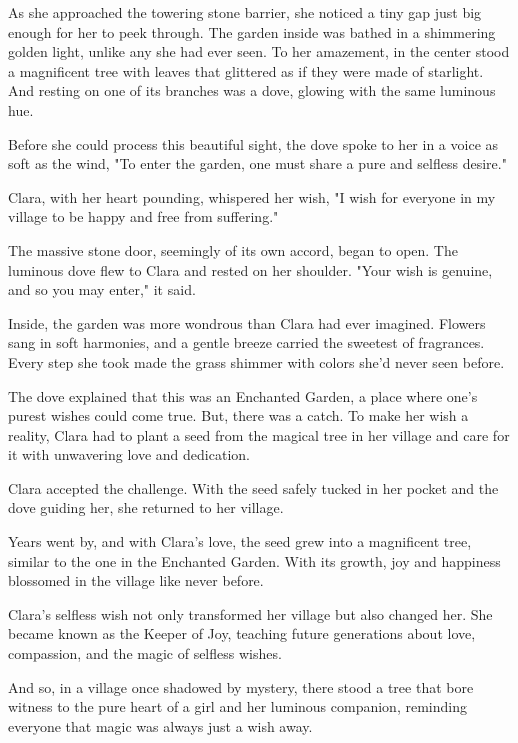 \documentclass[10pt, a4paper, titlepage]{article}
\begin{document}
As she approached the towering stone barrier, she noticed a tiny gap just big enough for her to peek through. The garden inside was bathed in a shimmering golden light, unlike any she had ever seen. To her amazement, in the center stood a magnificent tree with leaves that glittered as if they were made of starlight. And resting on one of its branches was a dove, glowing with the same luminous hue.

Before she could process this beautiful sight, the dove spoke to her in a voice as soft as the wind, "To enter the garden, one must share a pure and selfless desire."

Clara, with her heart pounding, whispered her wish, "I wish for everyone in my village to be happy and free from suffering."

The massive stone door, seemingly of its own accord, began to open. The luminous dove flew to Clara and rested on her shoulder. "Your wish is genuine, and so you may enter," it said.

Inside, the garden was more wondrous than Clara had ever imagined. Flowers sang in soft harmonies, and a gentle breeze carried the sweetest of fragrances. Every step she took made the grass shimmer with colors she'd never seen before.

The dove explained that this was an Enchanted Garden, a place where one’s purest wishes could come true. But, there was a catch. To make her wish a reality, Clara had to plant a seed from the magical tree in her village and care for it with unwavering love and dedication.

Clara accepted the challenge. With the seed safely tucked in her pocket and the dove guiding her, she returned to her village.

Years went by, and with Clara's love, the seed grew into a magnificent tree, similar to the one in the Enchanted Garden. With its growth, joy and happiness blossomed in the village like never before.

Clara's selfless wish not only transformed her village but also changed her. She became known as the Keeper of Joy, teaching future generations about love, compassion, and the magic of selfless wishes.

And so, in a village once shadowed by mystery, there stood a tree that bore witness to the pure heart of a girl and her luminous companion, reminding everyone that magic was always just a wish away.
\end{document}
